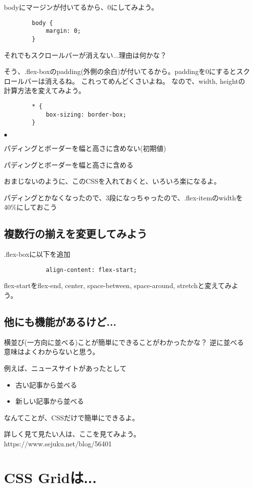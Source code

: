 \documentclass[mingoth,11pt,a4j,uplatex]{jsarticle}
\renewenvironment{description}%
{%
   \begin{list}{\parbox{1zw}{$\bullet$}}%
   {%
      \setlength{\topsep}{1zh}
      \setlength{\itemindent}{3zw}
      \setlength{\leftmargin}{5zw}%
      \setlength{\rightmargin}{0zw}%
      \setlength{\labelsep}{1zw}%
      \setlength{\labelwidth}{3zw}%
      \setlength{\itemsep}{0em}%
      \setlength{\parsep}{0em}%
      \setlength{\listparindent}{0zw}%
   }
}{%
   \end{list}%
}
\begin{document}
bodyにマージンが付いてるから、0にしてみよう。
\begin{lstlisting}
        body {
            margin: 0;
        }
\end{lstlisting}

それでもスクロールバーが消えない...理由は何かな？

そう、.flex-boxのpadding(外側の余白)が付いてるから。paddingを0にするとスクロールバーは消えるね。
これってめんどくさいよね。
なので、width, heightの計算方法を変えてみよう。
\begin{lstlisting}
        * {
            box-sizing: border-box;
        }
\end{lstlisting}
\begin{description}
\item[content-box] パディングとボーダーを幅と高さに含めない(初期値)
\item[border-box] パディングとボーダーを幅と高さに含める
\end{description}
おまじないのように、このCSSを入れておくと、いろいろ楽になるよ。

パディングとかなくなったので、3段になっちゃったので、.flex-itemのwidthを40\%にしておこう


\subsection{複数行の揃えを変更してみよう}
.flex-boxに以下を追加
\begin{lstlisting}
            align-content: flex-start;
\end{lstlisting}
flex-startをflex-end, center, space-between, space-around, stretchと変えてみよう。

\subsection{他にも機能があるけど...}
横並び(一方向に並べる)ことが簡単にできることがわかったかな？
逆に並べる意味はよくわからないと思う。

例えば、ニュースサイトがあったとして
\begin{itemize}
\item 古い記事から並べる
\item 新しい記事から並べる
\end{itemize}
なんてことが、CSSだけで簡単にできるよ。

詳しく見て見たい人は、ここを見てみよう。
https://www.sejuku.net/blog/56401


\section{CSS Gridは...}
\subsection{}


\end{document}
